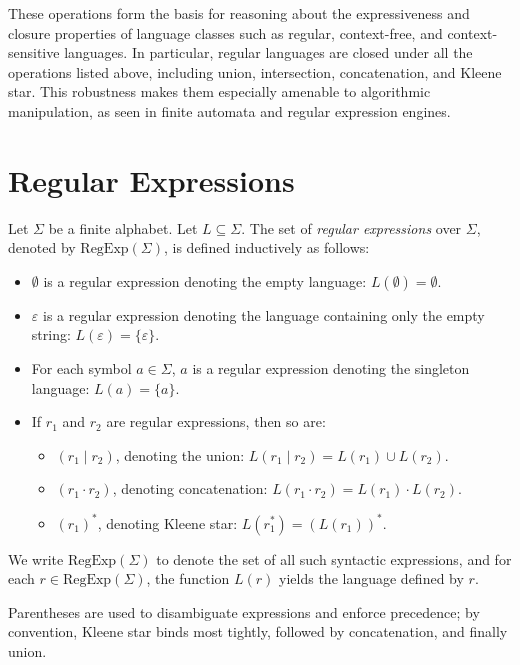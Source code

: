 These operations form the basis for reasoning about the expressiveness and closure properties of language classes such as regular, context-free, and context-sensitive languages. In particular, regular languages are closed under all the operations listed above, including union, intersection, concatenation, and Kleene star. This robustness makes them especially amenable to algorithmic manipulation, as seen in finite automata and regular expression engines.


\section{Regular Expressions}
Let $\Sigma$ be a finite alphabet. Let $L \subseteq \Sigma$. The set of \emph{regular expressions} over $\Sigma$, denoted by $\text{RegExp}(\Sigma)$, is defined inductively as follows:

\begin{itemize}
    \item $\emptyset$ is a regular expression denoting the empty language: $L(\emptyset) = \emptyset$.
    \item $\varepsilon$ is a regular expression denoting the language containing only the empty string: $L(\varepsilon) = \{ \varepsilon \}$.
    \item For each symbol $a \in \Sigma$, $a$ is a regular expression denoting the singleton language: $L(a) = \{ a \}$.
    \item If $r_1$ and $r_2$ are regular expressions, then so are:
    \begin{itemize}
        \item $(r_1 \mid r_2)$, denoting the union: $L(r_1 \mid r_2) = L(r_1) \cup L(r_2)$.
        \item $(r_1 \cdot r_2)$, denoting concatenation: $L(r_1 \cdot r_2) = L(r_1) \cdot L(r_2)$.
        \item $(r_1)^*$, denoting Kleene star: $L(r_1^*) = (L(r_1))^*$.
    \end{itemize}
\end{itemize}
We write $\text{RegExp}(\Sigma)$ to denote the set of all such syntactic expressions, and for each $r \in \text{RegExp}(\Sigma)$, the function $L(r)$ yields the language defined by $r$.

\medskip

Parentheses are used to disambiguate expressions and enforce precedence; by convention, Kleene star binds most tightly, followed by concatenation, and finally union.

